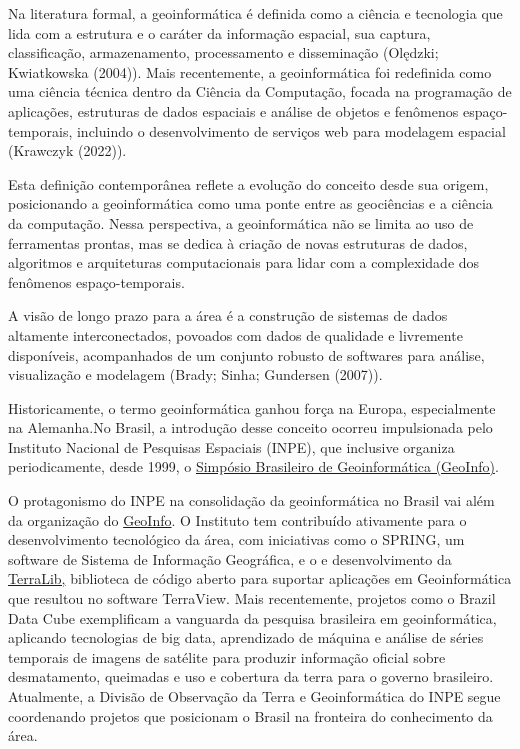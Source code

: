 \documentclass[
  letterpaper,
  DIV=11,
  numbers=noendperiod]{scrreprt}
\begin{document}
Na literatura formal, a geoinformática é definida como a ciência e
tecnologia que lida com a estrutura e o caráter da informação espacial,
sua captura, classificação, armazenamento, processamento e disseminação
(Olędzki; Kwiatkowska (2004)). Mais recentemente, a geoinformática foi
redefinida como uma ciência técnica dentro da Ciência da Computação,
focada na programação de aplicações, estruturas de dados espaciais e
análise de objetos e fenômenos espaço-temporais, incluindo o
desenvolvimento de serviços web para modelagem espacial (Krawczyk
(2022)).

Esta definição contemporânea reflete a evolução do conceito desde sua
origem, posicionando a geoinformática como uma ponte entre as
geociências e a ciência da computação. Nessa perspectiva, a
geoinformática não se limita ao uso de ferramentas prontas, mas se
dedica à criação de novas estruturas de dados, algoritmos e arquiteturas
computacionais para lidar com a complexidade dos fenômenos
espaço-temporais.

A visão de longo prazo para a área é a construção de sistemas de dados
altamente interconectados, povoados com dados de qualidade e livremente
disponíveis, acompanhados de um conjunto robusto de softwares para
análise, visualização e modelagem (Brady; Sinha; Gundersen (2007)).

Historicamente, o termo geoinformática ganhou força na Europa,
especialmente na Alemanha.No Brasil, a introdução desse conceito ocorreu
impulsionada pelo Instituto Nacional de Pesquisas Espaciais (INPE), que
inclusive organiza periodicamente, desde 1999, o
\href{http://www.geoinfo.info/}{Simpósio Brasileiro de Geoinformática
(GeoInfo)}.

O protagonismo do INPE na consolidação da geoinformática no Brasil vai
além da organização do \href{http://www.geoinfo.info/}{GeoInfo}. O
Instituto tem contribuído ativamente para o desenvolvimento tecnológico
da área, com iniciativas como o SPRING, um software de Sistema de
Informação Geográfica, e o e desenvolvimento da
\href{http://www.dpi.inpe.br/terralib}{TerraLib,} biblioteca de código
aberto para suportar aplicações em Geoinformática que resultou no
software TerraView. Mais recentemente, projetos como o Brazil Data Cube
exemplificam a vanguarda da pesquisa brasileira em geoinformática,
aplicando tecnologias de big data, aprendizado de máquina e análise de
séries temporais de imagens de satélite para produzir informação oficial
sobre desmatamento, queimadas e uso e cobertura da terra para o governo
brasileiro. Atualmente, a Divisão de Observação da Terra e
Geoinformática do INPE segue coordenando projetos que posicionam o
Brasil na fronteira do conhecimento da área.
\end{document}
